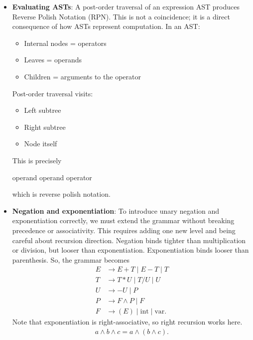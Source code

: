 \documentclass{report}
\begin{document}
\begin{itemize}
            \bigbreak \noindent 
            \bigbreak \noindent 
            becomes the AST
            \bigbreak \noindent 
            If the expression $a+b-c*d$ had no explicit parenthesis, the parse tree would be
            \bigbreak \noindent 
            \bigbreak \noindent 
            So, the AST would be 
            \bigbreak \noindent 
        \item \textbf{Evaluating ASTs}: A post-order traversal of an expression AST produces Reverse Polish Notation (RPN).
            \bigbreak \noindent 
            This is not a coincidence; it is a direct consequence of how ASTs represent computation.
            \bigbreak \noindent 
            In an AST:
            \begin{itemize}
                \item Internal nodes = operators
                \item Leaves = operands
                \item Children = arguments to the operator
            \end{itemize}
            Post-order traversal visits:
            \begin{itemize}
                \item Left subtree
                \item Right subtree
                \item Node itself
            \end{itemize}
            This is precisely
            \begin{center}
                operand operand operator
            \end{center}
            which is reverse polish notation.
        \item \textbf{Negation and exponentiation}: To introduce unary negation and exponentiation correctly, we must extend the grammar without breaking precedence or associativity. This requires adding one new level and being careful about recursion direction. Negation binds tighter than multiplication or division, but looser than exponentiation. Exponentiation binds looser than parenthesis. So, the grammar becomes
            \begin{align*}
                E &\to E + T \mid E - T \mid T \\ 
                T &\to T * U \mid T / U \mid U \\ 
                U &\to -U \mid P \\ 
                P &\to F\land P  \mid F \\ 
                F &\to (E) \mid \text{int} \mid \text{var}
            .\end{align*}
            Note that exponentiation is right-associative, so right recursion works here. 
            \begin{align*}
                a \land b \land c = a \land (b \land c) 
            .\end{align*}


    \end{itemize}
\end{document}
